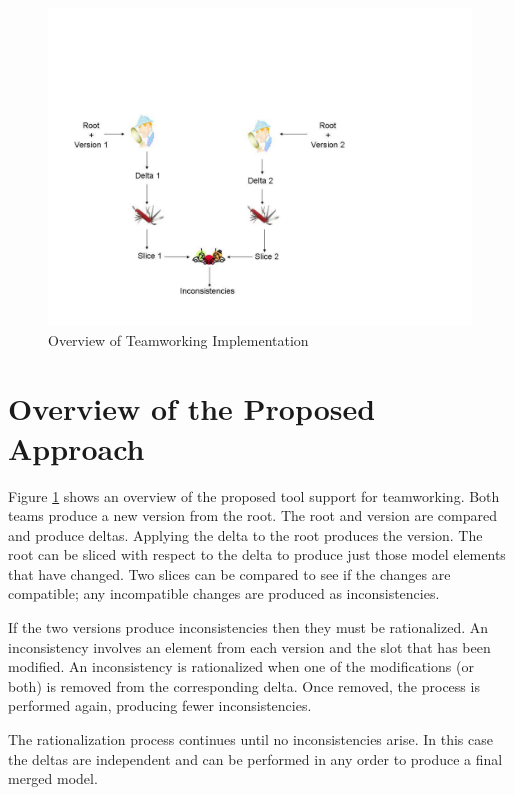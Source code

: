 %
\begin{figure}
\begin{center}


\includegraphics[width=12cm]{Programming/Teams/Images/Process.pdf}

\caption{Overview of Teamworking Implementation\label{fig:Overview-of-Teamworking}}

\end{center}
\end{figure}



\section{Overview of the Proposed Approach}

Figure \ref{fig:Overview-of-Teamworking} shows an overview of the
proposed tool support for teamworking. Both teams produce a new version
from the root. The root and version are compared and produce deltas.
Applying the delta to the root produces the version. The root can
be sliced with respect to the delta to produce just those model elements
that have changed. Two slices can be compared to see if the changes
are compatible; any incompatible changes are produced as inconsistencies.

If the two versions produce inconsistencies then they must be rationalized.
An inconsistency involves an element from each version and the slot
that has been modified. An inconsistency is rationalized when one
of the modifications (or both) is removed from the corresponding delta.
Once removed, the process is performed again, producing fewer inconsistencies.

The rationalization process continues until no inconsistencies arise.
In this case the deltas are independent and can be performed in any
order to produce a final merged model.


